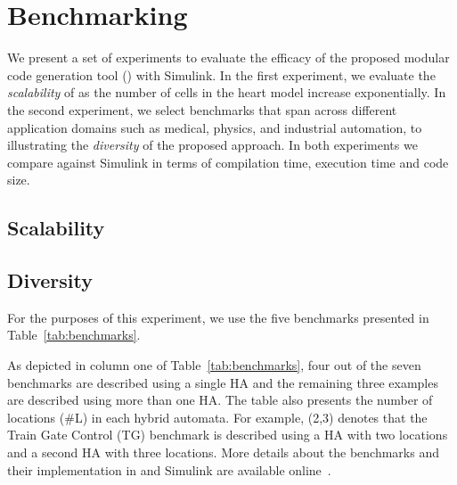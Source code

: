 \section{Benchmarking}
\label{sec:benchmarking}


We present a set of experiments to 
evaluate  the efficacy of the proposed 
 modular code generation tool (\ourTool) 
with Simulink. 
In the first experiment, we evaluate the \emph{scalability} 
of \ourTool as the number of cells in the heart model
increase exponentially. 
In the second experiment, we select benchmarks 
that span across different application
domains such as medical, physics, and 
industrial automation, to illustrating the \emph{diversity} of the proposed 
approach. 
In both experiments we compare against Simulink in terms of compilation time,
execution time and code size.


\subsection{Scalability}


\subsection{Diversity}
For the purposes of this experiment, we use the five benchmarks presented in
Table~\ref{tab:benchmarks}. 


As depicted in column one of Table~\ref{tab:benchmarks}, four out of the 
seven benchmarks are described using a single \ac{HA} and 
the remaining three examples are described using more than one \ac{HA}.
The table also presents the 
number of locations (\#L) in each hybrid automata.
For example, (2,3) denotes that the Train Gate Control
(TG) benchmark is described using a HA with two locations 
and a second HA with three locations. More details
about the benchmarks and their 
implementation in 
and Simulink
are available online~\cite{githubBenchmarks}.

